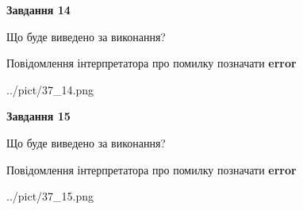 \documentclass[11pt, ukrainian]{article}
\begin{document}
{\begin {large}
{\begin {center}\textbf{Завдання 14}\end {center}}\par
Що буде виведено за виконання? \par
Повідомлення інтерпретатора про помилку позначати \textbf{error}

\begin{center}
	{../pict/37_14.png}
\end{center}
\newpage

{\begin {center}\textbf{Завдання 15}\end {center}}\par
Що буде виведено за виконання? \par
Повідомлення інтерпретатора про помилку позначати \textbf{error}

\begin{center}
	{../pict/37_15.png}
\end{center}
\newpage

\end {large}}
\end{document}
